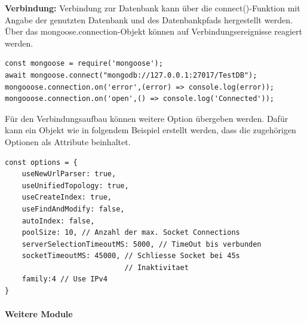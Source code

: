 \newpage
\noindent
\textbf{Verbindung:}
Verbindung zur Datenbank kann über die connect()-Funktion mit Angabe der genutzten Datenbank und des Datenbankpfads hergestellt werden. 
Über das mongoose.connection-Objekt können auf Verbindungsereignisse reagiert werden. 
\newline

\begin{lstlisting}[caption=Mongoose: Verbindung zur Datenbank aufbauen,
label=lst:MongooseConnect]
const mongoose = require('mongoose');
await mongoose.connect("mongodb://127.0.0.1:27017/TestDB");
mongooose.connection.on('error',(error) => console.log(error));
mongooose.connection.on('open',() => console.log('Connected'));
\end{lstlisting}

\noindent
Für den Verbindungsaufbau können weitere Option übergeben werden. Dafür kann ein Objekt wie in folgendem Beispiel erstellt werden, dass die zugehörigen Optionen als Attribute beinhaltet. 
\newline

\begin{lstlisting}[caption=Mongoose Verbindungsoptionen \protect \footnotemark  ,label=lst:MongooseConnect]
const options = {
	useNewUrlParser: true,
	useUnifiedTopology: true,
	useCreateIndex: true,
	useFindAndModify: false,
	autoIndex: false,
	poolSize: 10, // Anzahl der max. Socket Connections
	serverSelectionTimeoutMS: 5000, // TimeOut bis verbunden
	socketTimeoutMS: 45000, // Schliesse Socket bei 45s                 
	                        // Inaktivitaet
	family:4 // Use IPv4
}
\end{lstlisting}


\paragraph{Weitere Module}

